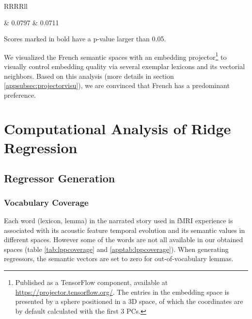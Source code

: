 \begin{table}
\begin{ThreePartTable}
\begin{tabularx}{\textwidth}{RRRRll}

     & 0.0797 & 0.0711 \\  

    \bottomrule
    \end{tabularx}
    \begin{tablenotes}
        \footnotesize
        \item Scores marked in bold have a p-value larger than 0.05.
    \end{tablenotes}
    \end{ThreePartTable}
    
    \caption[French Semantic Space Semantic Ranking Task Results]{The results are consistent with English semantic spaces, despite the poor quality of French benchmark datasets.  has high performance in \similarity and negligible \association scores. The relatively poor de-correlation between  and  resulted a  still containing abundant \similarity information.  however, cancels out completely \association information even compared with  while retained \similarity signals.}
    \label{tab:fredecorrelationscores}
    \end{table}

We visualized the French semantic spaces with an embedding projector\footnote{Published as a TensorFlow component, available at \url{https://projector.tensorflow.org/}. The entries in the embedding space is presented by a sphere positioned in a 3D space, of which the coordinates are by default calculated with the first 3 PCs.} to visually control embedding quality via several exemplar lexicons and its vectorial neighbors. Based on this analysis (more details in section \ref{appsubsec:projectorvisu}), we are convinced that French  has a predominant \association preference.

\section{Computational Analysis of Ridge Regression}

\subsection{Regressor Generation}

\subsubsection{Vocabulary Coverage}
Each word (lexicon, lemma) in the narrated story used in fMRI experience is associated with its  acoustic feature temporal evolution and its semantic values in different spaces. However some of the words are not all available in our obtained spaces (table \ref{tab:lppcoverage} and \ref{apptab:lppcoverage}). When generating regressors, the semantic vectors are set to zero for out-of-vocabulary lemmas. 

